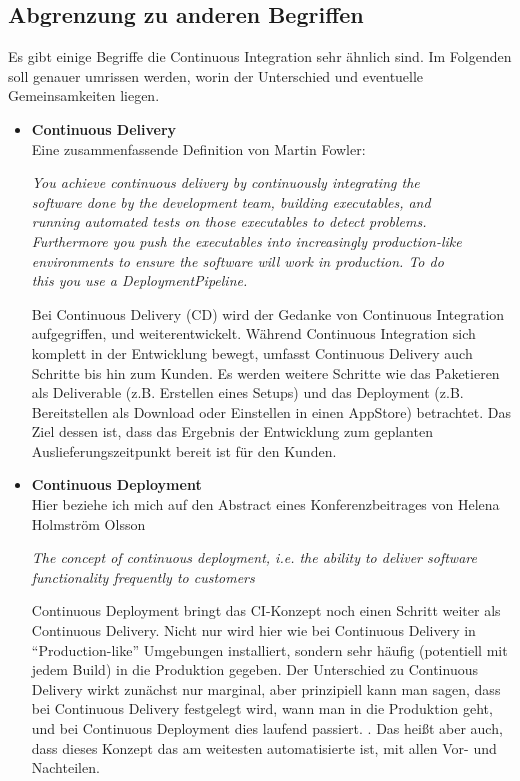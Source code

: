 \subsection{Abgrenzung zu anderen Begriffen}
Es gibt einige Begriffe die Continuous Integration sehr ähnlich sind. Im Folgenden soll genauer umrissen werden, worin der Unterschied und eventuelle Gemeinsamkeiten liegen.
\begin{itemize}
	\item\textbf{Continuous Delivery}\\
	Eine zusammenfassende Definition von Martin Fowler:
\begin{center}
	\textit{
	You achieve continuous delivery by continuously integrating the \\software done by the development team, building executables, and\\ running automated tests on those executables to detect problems. \\Furthermore you push the executables into increasingly production-like \\environments to ensure the software will work in production. To do \\this you use a DeploymentPipeline.}\\ \cite{fowler-CD}
\end{center}
	Bei Continuous Delivery (CD) wird der Gedanke von Continuous Integration aufgegriffen, und weiterentwickelt. Während Continuous Integration sich komplett in der Entwicklung bewegt, umfasst Continuous Delivery auch Schritte bis hin zum Kunden. Es werden weitere Schritte wie das Paketieren als Deliverable (z.B. Erstellen eines Setups) und das Deployment (z.B. Bereitstellen als Download oder Einstellen in einen AppStore) betrachtet. Das Ziel dessen ist, dass das Ergebnis der Entwicklung zum geplanten Auslieferungszeitpunkt bereit ist für den Kunden.\\
	\item\textbf{Continuous Deployment}\\
	Hier beziehe ich mich auf den Abstract eines Konferenzbeitrages von Helena Holmström Olsson
	\begin{center}
		\textit{
		The concept of continuous deployment, i.e. the ability to deliver software functionality frequently to customers \textelp{}}\\
		\cite{olsson2012climbing}
	\end{center}
	Continuous Deployment bringt das CI-Konzept noch einen Schritt weiter als Continuous Delivery. Nicht nur wird hier wie bei Continuous Delivery in "`Production-like"' Umgebungen installiert, sondern sehr häufig (potentiell mit jedem Build) in die Produktion gegeben. Der Unterschied zu Continuous Delivery wirkt zunächst nur marginal, aber prinzipiell kann man sagen, dass bei Continuous Delivery festgelegt wird, wann man in die Produktion geht, und bei Continuous Deployment dies laufend passiert. \cite{scrum-overview-ci-cd}. Das heißt aber auch, dass dieses Konzept das am weitesten automatisierte ist, mit allen Vor- und Nachteilen.
	
	
\end{itemize}

